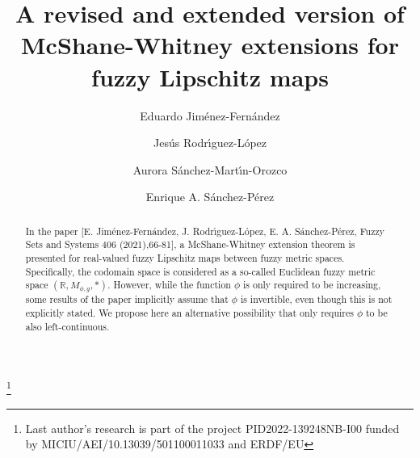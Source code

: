 \documentclass[12pt]{amsart}
\begin{document}
	
		
		
		\title[McShane-Whitney extensions for fuzzy Lipschitz maps]{A revised and extended version of McShane-Whitney extensions for fuzzy Lipschitz maps}
		
	
	
	\author[E. Jim\'enez-Fern\'andez et al.]{Eduardo Jim\'enez-Fern\'andez}
	\address[E. Jim\'enez-Fern\'andez]{Departamento de Teor\'{\i}a e Historia Econ\'omica, Campus Universitario de Cartuja, Universidad de Granada, 18071 Granada, Spain}
	
	\author[]{Jes\'us Rodr\'{\i}guez-L\'opez}
	\address[J. Rodr\'{\i}guez-L\'opez]{Instituto Universitario de Matem\'atica Pura y Aplicada, Universitat Polit\`ecnica de Val\`encia, Camino de Vera s/n, 46022 Valencia, Spain}\thanks{Last author's research
		is part of the project PID2022-139248NB-I00 funded by MICIU/AEI/10.13039/501100011033 and ERDF/EU}
	
	\author[]{Aurora S\'anchez-Mart\'{\i}n-Orozco}
	\address[A. S\'anchez-Mart\'{\i}n-Orozco]{Instituto Universitario de Matem\'atica Pura y Aplicada, Universitat Polit\`ecnica de Val\`encia, Camino de Vera s/n, 46022 Valencia, Spain}
	
	\author[]{Enrique A. S\'anchez-P\'erez}
	\address[E. A. S\'anchez-P\'erez]{Instituto Universitario de Matem\'atica Pura y Aplicada, Universitat Polit\`ecnica de Val\`encia, Camino de Vera s/n, 46022 Valencia, Spain}
	
	
	
	
		
	

		
		\begin{abstract}
			In the paper [E. Jim\'enez-Fern\'andez, J. Rodr\'{\i}guez-L\'opez, E. A. S\'anchez-P\'erez, Fuzzy Sets and Systems 406 (2021),66-81], a McShane-Whitney extension theorem is presented for real-valued fuzzy Lipschitz maps between fuzzy metric spaces. Specifically, the codomain space is considered as a so-called Euclidean fuzzy metric space $(\mathbb{R},M_{\phi,g},\ast).$ However, while the function $\phi$ is only required to be increasing, some results of the paper implicitly assume that $\phi$ is invertible, even though this is not explicitly stated. We propose here an alternative possibility that only requires $\phi$ to be also left-continuous. 
		\end{abstract}
		
\end{document}
